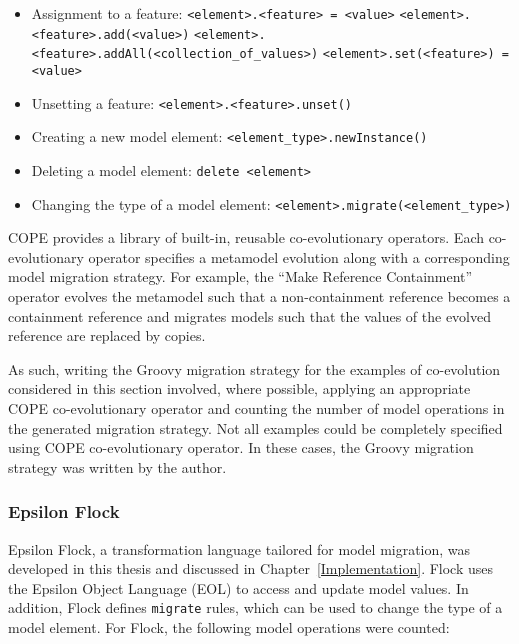 \begin{itemize}
	\item Assignment to a feature:
	\subitem \texttt{<element>.<feature> = <value>}
	\subitem \texttt{<element>.<feature>.add(<value>)}
	\subitem \texttt{<element>.<feature>.addAll(<collection\_of\_values>)}
	\subitem \texttt{<element>.set(<feature>) = <value>}
	
	\item Unsetting a feature:
	\subitem \texttt{<element>.<feature>.unset()}	
	
	\item Creating a new model element:
	\subitem \texttt{<element\_type>.newInstance()}
	
	\item Deleting a model element:
	\subitem \texttt{delete <element>}
	
	\item Changing the type of a model element:
	\subitem \texttt{<element>.migrate(<element\_type>)}
\end{itemize}

COPE provides a library of built-in, reusable co-evolutionary operators. Each co-evolutionary operator specifies a metamodel evolution along with a corresponding model migration strategy. For example, the ``Make Reference Containment'' operator evolves the metamodel such that a non-containment reference becomes a containment reference and migrates models such that the values of the evolved reference are replaced by copies.

As such, writing the Groovy migration strategy for the examples of co-evolution considered in this section involved, where possible, applying an appropriate COPE co-evolutionary operator and counting the number of model operations in the generated migration strategy. Not all examples could be completely specified using COPE co-evolutionary operator. In these cases, the Groovy migration strategy was written by the author.


\subsubsection{Epsilon Flock}
Epsilon Flock, a transformation language tailored for model migration, was developed in this thesis and discussed in Chapter~\ref{Implementation}. Flock uses the Epsilon Object Language (EOL) \cite{kolovos06eol} to access and update model values. In addition, Flock defines \texttt{migrate} rules, which can be used to change the type of a model element. For Flock, the following model operations were counted:

